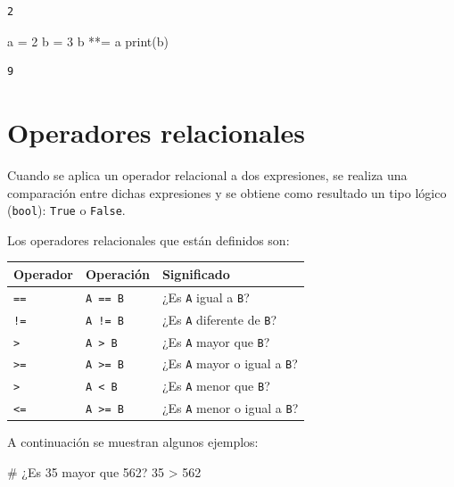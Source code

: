 \documentclass[
  spanish,
  letterpaper,
]{scrbook}
\newenvironment{Shaded}{\begin{snugshade}}{\end{snugshade}}
\newcommand{\BuiltInTok}[1]{\textcolor[rgb]{0.00,0.23,0.31}{#1}}
\newcommand{\CommentTok}[1]{\textcolor[rgb]{0.37,0.37,0.37}{#1}}
\newcommand{\DecValTok}[1]{\textcolor[rgb]{0.68,0.00,0.00}{#1}}
\newcommand{\NormalTok}[1]{\textcolor[rgb]{0.00,0.23,0.31}{#1}}
\newcommand{\OperatorTok}[1]{\textcolor[rgb]{0.37,0.37,0.37}{#1}}
\theoremstyle{definition}
\theoremstyle{remark}
\begin{document}
\begin{verbatim}
2
\end{verbatim}

\begin{Shaded}
\begin{Highlighting}[]
\NormalTok{a }\OperatorTok{=} \DecValTok{2}
\NormalTok{b }\OperatorTok{=} \DecValTok{3}
\NormalTok{b }\OperatorTok{**=}\NormalTok{ a }
\BuiltInTok{print}\NormalTok{(b)}
\end{Highlighting}
\end{Shaded}

\begin{verbatim}
9
\end{verbatim}

\section{Operadores relacionales}\label{operadores-relacionales}

Cuando se aplica un operador relacional a dos expresiones, se realiza
una comparación entre dichas expresiones y se obtiene como resultado un
tipo lógico (\texttt{bool}): \texttt{True} o \texttt{False}.

Los operadores relacionales que están definidos son:

\begin{longtable}[]{@{}lll@{}}
\toprule\noalign{}
Operador & Operación & Significado \\
\midrule\noalign{}
\endhead
\bottomrule\noalign{}
\endlastfoot
\texttt{==} & \texttt{A\ ==\ B} & ¿Es \texttt{A} igual a \texttt{B}? \\
\texttt{!=} & \texttt{A\ !=\ B} & ¿Es \texttt{A} diferente de
\texttt{B}? \\
\texttt{\textgreater{}} & \texttt{A\ \textgreater{}\ B} & ¿Es \texttt{A}
mayor que \texttt{B}? \\
\texttt{\textgreater{}=} & \texttt{A\ \textgreater{}=\ B} & ¿Es
\texttt{A} mayor o igual a \texttt{B}? \\
\texttt{\textgreater{}} & \texttt{A\ \textless{}\ B} & ¿Es \texttt{A}
menor que \texttt{B}? \\
\texttt{\textless{}=} & \texttt{A\ \textgreater{}=\ B} & ¿Es \texttt{A}
menor o igual a \texttt{B}? \\
\end{longtable}

A continuación se muestran algunos ejemplos:

\begin{Shaded}
\begin{Highlighting}[]
\CommentTok{\# ¿Es 35 mayor que 562?}
\DecValTok{35} \OperatorTok{\textgreater{}} \DecValTok{562} 
\end{Highlighting}
\end{Shaded}
\end{document}
